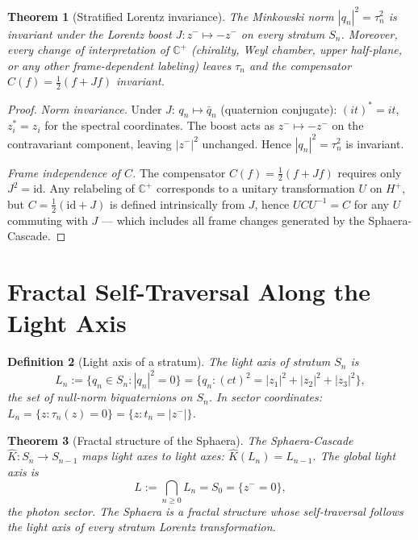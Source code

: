 \documentclass[12pt,a4paper]{article}
\newtheorem{theorem}{Theorem}[section]
\newtheorem{definition}[theorem]{Definition}
\newcommand{\zminus}{z^-}
\newcommand{\Hplus}{H^+}
\newcommand{\KC}{\hat{K}}
\begin{document}
\begin{theorem}[Stratified Lorentz invariance]\label{thm:lorentz}
The Minkowski norm $|q_n|^2=\tau_n^2$ is invariant under the Lorentz
boost $J:z^-\mapsto-z^-$ on every stratum $S_n$.
Moreover, every change of interpretation of $\mathbb{C}^+$ (chirality,
Weyl chamber, upper half-plane, or any other frame-dependent labeling)
leaves $\tau_n$ and the compensator $C(f)=\tfrac{1}{2}(f+Jf)$
invariant.
\end{theorem}

\begin{proof}
\emph{Norm invariance.}
Under $J$: $q_n\mapsto\bar q_n$ (quaternion conjugate):
$(it)^*=it$, $z_i^*=z_i$ for the spectral coordinates.
The boost acts as $\zminus\mapsto-\zminus$ on the contravariant
component, leaving $|\zminus|^2$ unchanged.
Hence $|q_n|^2=\tau_n^2$ is invariant.

\emph{Frame independence of $C$.}
The compensator $C(f)=\tfrac{1}{2}(f+Jf)$ requires only $J^2=\mathrm{id}$.
Any relabeling of $\mathbb{C}^+$ corresponds to a unitary transformation
$U$ on $\Hplus$, but $C=\tfrac{1}{2}(\mathrm{id}+J)$ is defined
intrinsically from $J$, hence $UCU^{-1}=C$ for any $U$ commuting with
$J$ --- which includes all frame changes generated by the Sphaera-Cascade.
\end{proof}


\section{Fractal Self-Traversal Along the Light Axis}
\label{sec:fractal}

\begin{definition}[Light axis of a stratum]
The light axis of stratum $S_n$ is
\[
  L_n := \{q_n\in S_n : |q_n|^2=0\}
       = \{q_n : (ct)^2 = |z_1|^2+|z_2|^2+|z_3|^2\},
\]
the set of null-norm biquaternions on $S_n$.
In sector coordinates: $L_n=\{z:\tau_n(z)=0\}=\{z:t_n=|\zminus|\}$.
\end{definition}

\begin{theorem}[Fractal structure of the Sphaera]\label{thm:fractal}
The Sphaera-Cascade $\KC:S_n\to S_{n-1}$ maps light axes to light axes:
$\KC(L_n)=L_{n-1}$.
The global light axis is
\[
  L := \bigcap_{n\geq 0} L_n = S_0 = \{\zminus=0\},
\]
the photon sector.
The Sphaera is a fractal structure whose self-traversal follows the
light axis of every stratum Lorentz transformation.
\end{theorem}
\end{document}
